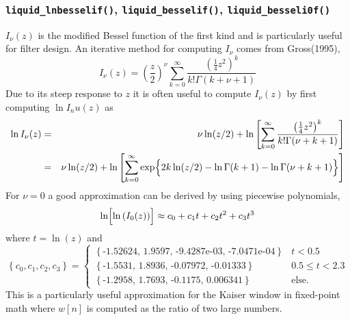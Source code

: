 \subsubsection{{\tt liquid\_lnbesselif()},
               {\tt liquid\_besselif()},
               {\tt liquid\_besseli0f()}}
\label{module:math:transcendentals:besseli}
$I_\nu(z)$ is the modified Bessel function of the first kind and is
particularly useful for filter design.
An iterative method for computing $I_\nu$ comes from Gross(1995),
\begin{equation}
\label{eqn:math:besseli}
    I_\nu(z) =
        \left(\frac{z}{2}\right)^\nu
        \sum_{k=0}^{\infty}{\frac{\left(\frac{1}{4}z^2\right)^k}{k!\Gamma(k+\nu+1)}}
\end{equation}
%
Due to its steep response to $z$ it is often useful to compute
$I_\nu(z)$ by first computing $\ln I_nu(z)$ as
%
\begin{eqnarray*}
\label{eqn:math:lnbesseli}
    \ln I_\nu(z) & = &
        \nu\ln(z/2) + \ln\left[
            \sum_{k=0}^\infty{
                \frac{
                    \left(\frac{1}{4}z^2\right)^k
                }{
                    k! \Gamma(\nu + k + 1)
                }
            }
        \right] \\
        & = &
        \nu\ln(z/2) + \ln\left[
            \sum_{k=0}^\infty{ \exp\Bigl\{
                2 k \ln(z/2) - \ln\Gamma(k+1) - \ln\Gamma(\nu+k+1)
            \Bigr\} }
        \right] \\
\end{eqnarray*}
%
For $\nu=0$ a good approximation can be derived by
using piecewise polynomials,
%
\begin{equation}
\label{eqn:math:besseli0_approx}
    \ln\Bigl[\ln\left(I_0(z)\right)\Bigr] \approx
    c_0 + c_1 t + c_2 t ^2 + c_3 t^3
\end{equation}
%
where $t=\ln(z)$ and
%
\[
    \left\{c_0,c_1,c_2,c_3\right\} =
    \begin{cases}
    \left\{\text{-1.52624, 1.9597, -9.4287e-03, -7.0471e-04}\right\} & t < 0.5 \\
    \left\{\text{-1.5531, 1.8936, -0.07972, -0.01333}\right\} & 0.5 \le t < 2.3 \\
    \left\{\text{-1.2958, 1.7693, -0.1175, 0.006341}\right\} & \text{else}.
    \end{cases}
\]
This is a particularly useful approximation for the Kaiser window in
fixed-point math where $w[n]$ is computed as the ratio of two large numbers.



